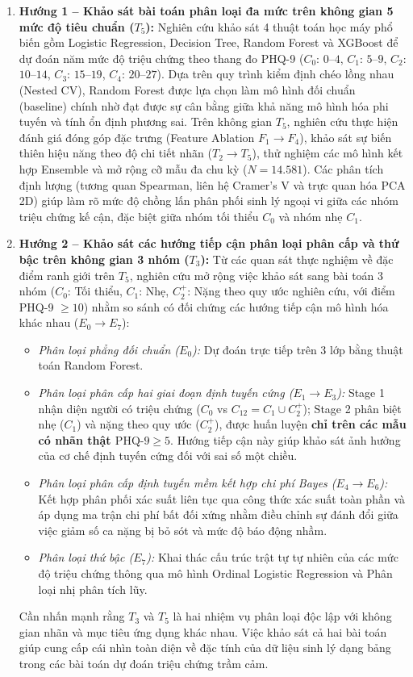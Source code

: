 \begin{enumerate}
    \item \textbf{Hướng 1 -- Khảo sát bài toán phân loại đa mức trên không gian 5 mức độ tiêu chuẩn ($T_5$):} 
    Nghiên cứu khảo sát 4 thuật toán học máy phổ biến gồm Logistic Regression, Decision Tree, Random Forest và XGBoost để dự đoán năm mức độ triệu chứng theo thang đo PHQ-9 ($C_0$: $0$--$4$, $C_1$: $5$--$9$, $C_2$: $10$--$14$, $C_3$: $15$--$19$, $C_4$: $20$--$27$). Dựa trên quy trình kiểm định chéo lồng nhau (Nested CV), Random Forest được lựa chọn làm mô hình đối chuẩn (baseline) chính nhờ đạt được sự cân bằng giữa khả năng mô hình hóa phi tuyến và tính ổn định phương sai. Trên không gian $T_5$, nghiên cứu thực hiện đánh giá đóng góp đặc trưng (Feature Ablation $F_1 \to F_4$), khảo sát sự biến thiên hiệu năng theo độ chi tiết nhãn ($T_2 \to T_5$), thử nghiệm các mô hình kết hợp Ensemble và mở rộng cỡ mẫu đa chu kỳ ($N = 14.581$). Các phân tích định lượng (tương quan Spearman, liên hệ Cramer's V và trực quan hóa PCA 2D) giúp làm rõ mức độ chồng lấn phân phối sinh lý ngoại vi giữa các nhóm triệu chứng kế cận, đặc biệt giữa nhóm tối thiểu $C_0$ và nhóm nhẹ $C_1$.
    
    \item \textbf{Hướng 2 -- Khảo sát các hướng tiếp cận phân loại phân cấp và thứ bậc trên không gian 3 nhóm ($T_3$):} 
    Từ các quan sát thực nghiệm về đặc điểm ranh giới trên $T_5$, nghiên cứu mở rộng việc khảo sát sang bài toán 3 nhóm ($C_0$: Tối thiểu, $C_1$: Nhẹ, $C_2^+$: Nặng theo quy ước nghiên cứu, với điểm PHQ-9 $\ge 10$) nhằm so sánh có đối chứng các hướng tiếp cận mô hình hóa khác nhau ($E_0 \to E_7$):
    \begin{itemize}
        \item \textit{Phân loại phẳng đối chuẩn ($E_0$):} Dự đoán trực tiếp trên 3 lớp bằng thuật toán Random Forest.
        \item \textit{Phân loại phân cấp hai giai đoạn định tuyến cứng ($E_1 \to E_3$):} Stage 1 nhận diện người có triệu chứng ($C_0$ vs $C_{12} = C_1 \cup C_2^+$); Stage 2 phân biệt nhẹ ($C_1$) và nặng theo quy ước ($C_2^+$), được huấn luyện \textbf{chỉ trên các mẫu có nhãn thật $\text{PHQ-9} \ge 5$}. Hướng tiếp cận này giúp khảo sát ảnh hưởng của cơ chế định tuyến cứng đối với sai số một chiều.
        \item \textit{Phân loại phân cấp định tuyến mềm kết hợp chi phí Bayes ($E_4 \to E_6$):} Kết hợp phân phối xác suất liên tục qua công thức xác suất toàn phần và áp dụng ma trận chi phí bất đối xứng nhằm điều chỉnh sự đánh đổi giữa việc giảm số ca nặng bị bỏ sót và mức độ báo động nhầm.
        \item \textit{Phân loại thứ bậc ($E_7$):} Khai thác cấu trúc trật tự tự nhiên của các mức độ triệu chứng thông qua mô hình Ordinal Logistic Regression và Phân loại nhị phân tích lũy.
    \end{itemize}
    Cần nhấn mạnh rằng $T_3$ và $T_5$ là hai nhiệm vụ phân loại độc lập với không gian nhãn và mục tiêu ứng dụng khác nhau. Việc khảo sát cả hai bài toán giúp cung cấp cái nhìn toàn diện về đặc tính của dữ liệu sinh lý dạng bảng trong các bài toán dự đoán triệu chứng trầm cảm.
\end{enumerate}


